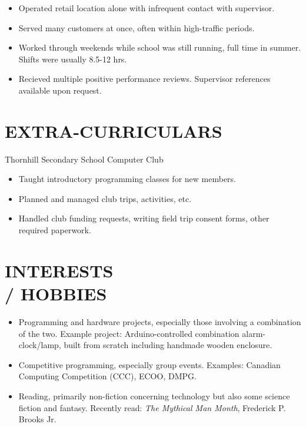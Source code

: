 \documentclass[11pt, margin]{res}
\begin{document}
\begin{resume}
                \begin{itemize}[itemsep=-2pt]
                    \item Operated retail location alone with infrequent contact with supervisor.
                    \item Served many customers at once, often within high-traffic periods.
                    \item Worked through weekends while school was still running, full time in summer. Shifts were usually 8.5-12 hrs.
                    \item Recieved multiple positive performance reviews. Supervisor references available upon request.
                \end{itemize}
 
\section{EXTRA-CURRICULARS}             
            Thornhill Secondary School Computer Club
            \begin{itemize}[itemsep=-2pt]
                \item Taught introductory programming classes for new members.
                \item Planned and managed club trips, activities, etc.
                \item Handled club funding requests, writing field trip consent forms, other required paperwork.
            \end{itemize}

\section{INTERESTS \\ / HOBBIES}
            \begin{itemize}[leftmargin=*, itemsep=-2pt]
                \item Programming and hardware projects, especially those involving a combination of the two. Example project: Arduino-controlled combination alarm-clock/lamp, built from scratch including handmade wooden enclosure.
                \item Competitive programming, especially group events. Examples: Canadian Computing Competition (CCC), ECOO, DMPG.
                \item Reading, primarily non-fiction concerning technology but also some science fiction and fantasy. Recently read: {\sl The Mythical Man Month}, Frederick P. Brooks Jr.
            \end{itemize}




\end{resume}
\end{document}
